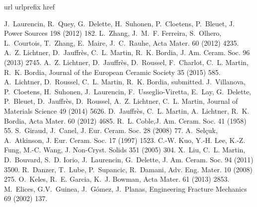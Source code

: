\documentclass[preprint,12pt,3p]{elsarticle}
\begin{document}
%
\begin{thebibliography}{10}
\expandafter\ifx\csname url\endcsname\relax
  \def\url#1{\texttt{#1}}\fi
\expandafter\ifx\csname urlprefix\endcsname\relax\def\urlprefix{URL }\fi
\expandafter\ifx\csname href\endcsname\relax
  \def\href#1#2{#2} \def\path#1{#1}\fi

J.~Laurencin, R.~Quey, G.~Delette, H.~Suhonen, P.~Cloetens, P.~Bleuet, J. Power Sources
  198 (2012) 182.
L.~Zhang, J.~M.~F. Ferreira, S.~Olhero, L.~Courtois, T.~Zhang, E.~Maire,
  J.~C.~Rauhe,  Acta Mater. 60 (2012) 4235.
A.~Z. Lichtner, D.~Jauffr\`{e}s, C.~L. Martin, R.~K. Bordia, J. Am. Ceram. Soc. 96
  (2013) 2745.
A.~Z. Lichtner, D.~Jauffr\`{e}s, D.~Roussel, F.~Charlot, C.~L. Martin, R.~K.
  Bordia, Journal of the European Ceramic Society 35
  (2015) 585.
A.~Lichtner, D.~Roussel, C.~L. Martin, R.~K. Bordia,  submitted.
J.~Villanova, P.~Cloetens, H.~Suhonen, J.~Laurencin, F.~Usseglio-Viretta,
  E.~Lay, G.~Delette, P.~Bleuet, D.~Jauffr\`{e}s, D.~Roussel, A.~Z. Lichtner,
  C.~L. Martin, Journal of Materials Science 49 (2014) 5626.
D.~Jauffr\`{e}s, C.~L. Martin, A.~Lichtner, R.~K. Bordia,
  Acta Mater. 60 (2012) 4685.
R.~L. Coble,J. Am. Ceram. Soc. 41 (1958) 55.
S.~Giraud, J.~Canel, J. Eur. Ceram. Soc. 28 (2008) 77.
A.~Sel\c{c}uk, A.~Atkinson,  J. Eur. Ceram. Soc. 17 (1997) 1523.
C.-W. Kuo, Y.-H. Lee, K.-Z. Fung, M.-C. Wang, J. Non-Cryst. Solids 351 (2005) 304.
X.~Liu, C.~L. Martin, D.~Bouvard, S.~D. Iorio, J.~Laurencin, G.~Delette, J. Am. Ceram. Soc. 94 (2011) 3500.
R.~Danzer, T.~Lube, P.~Supancic, R.~Damani, Adv. Eng.  Mater. 10 (2008) 275.
O.~Keles, R.~E. Garcia, K.~J. Bowman, Acta Mater. 61 (2013) 2853.
M.~Elices, G.V.~Guinea, J.~Gómez, J.~Planas, Engineering Fracture Mechanics 69 (2002) 137.
\end{thebibliography}
\end{document}
